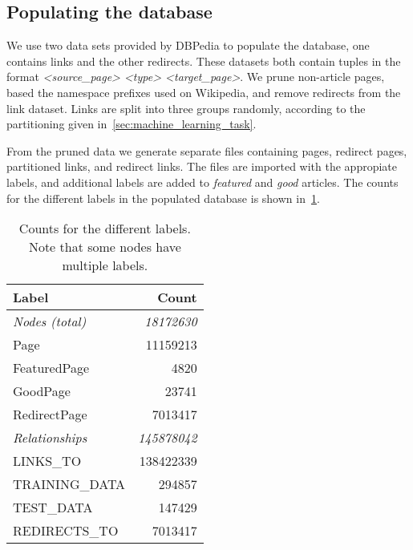 \subsection{Populating the database} \label{sec:db_populate}
We use two data sets provided by DBPedia to populate the database, one contains links and the other redirects. These datasets both contain tuples in the format \emph{<source\_page> <type> <target\_page>}.  We prune non-article pages, based the namespace prefixes used on Wikipedia, and remove redirects from the link dataset. Links are split into three groups randomly, according to the partitioning given in~\cref{sec:machine_learning_task}. 

From the pruned data we generate separate files containing pages, redirect pages, partitioned links, and redirect links. The files are imported with the appropiate labels, and additional labels are added to \emph{featured} and \emph{good} articles.
 The counts for the different labels in the populated database is shown in~\cref{tab:db_counts}.

\begin{table}[]
\centering
\begin{tabular}{@{}lr@{}}
\toprule
\textbf{Label}         & \textbf{Count}     \\ \midrule
\textit{Nodes (total)} & \textit{18172630}  \\
Page                   & 11159213           \\
FeaturedPage           & 4820               \\
GoodPage               & 23741              \\
RedirectPage           & 7013417            \\ \midrule
\textit{Relationships} & \textit{145878042} \\
LINKS\_TO              & 138422339          \\
TRAINING\_DATA         & 294857             \\
TEST\_DATA             & 147429             \\
REDIRECTS\_TO          & 7013417            \\ \bottomrule
\end{tabular}
\caption{Counts for the different labels. Note that some nodes have multiple labels.}
\label{tab:db_counts}
\end{table}
